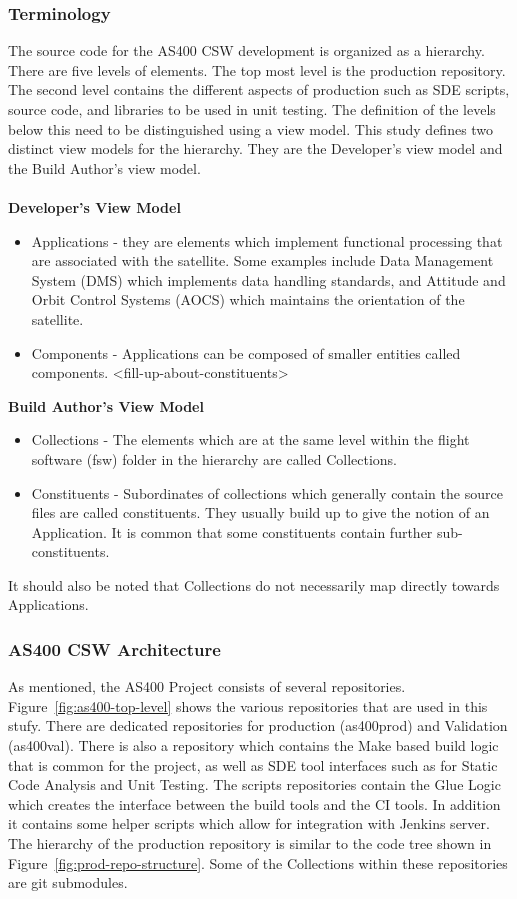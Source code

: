 \documentclass[12pt, a4paper, titlepage]{scrartcl}
\begin{document}
\subsubsection{Terminology}
The source code for the AS400 CSW development is organized as a hierarchy. There are five levels of elements. The top most level is the production repository. The second level contains the different aspects of production such as SDE scripts, source code, and libraries to be used in unit testing. The definition of the levels below this need to be distinguished using a view model. This study defines two distinct view models for the hierarchy. They are the Developer's view model and the Build Author's view model. \\
\\
\textbf{Developer's View Model}
\begin{itemize}
	\item Applications - they are elements which implement functional processing that are associated with the satellite. Some examples include Data Management System (DMS) which implements data handling standards, and Attitude and Orbit Control Systems (AOCS) which maintains the orientation of the satellite.
	\item Components - Applications can be composed of smaller entities called components. <fill-up-about-constituents>
\end{itemize}
\textbf{Build Author's View Model}
\begin{itemize}
	\item Collections - The elements which are at the same level within the flight software (fsw) folder in the hierarchy are called Collections. 
	\item Constituents - Subordinates of collections which generally contain the source files are called constituents. They usually build up to give the notion of an Application. It is common that some constituents contain further sub-constituents.
\end{itemize}
It should also be noted that Collections do not necessarily map directly towards Applications. 

\subsubsection{AS400 CSW Architecture }
As mentioned, the AS400 Project consists of several repositories. Figure~\ref{fig:as400-top-level} shows the various repositories that are used in this stufy. There are dedicated repositories for production (as400prod) and Validation (as400val). There is also a repository which contains the Make based build logic that is common for the project, as well as SDE tool interfaces such as for Static Code Analysis and Unit Testing. The scripts repositories contain the Glue Logic which creates the interface between the build tools and the CI tools. In addition it contains some helper scripts which allow for integration with Jenkins server. The hierarchy of the production repository is similar to the code tree shown in Figure~\ref{fig:prod-repo-structure}. Some of the Collections within these repositories are git submodules\cite{chacon2011git}.  
\end{document}

